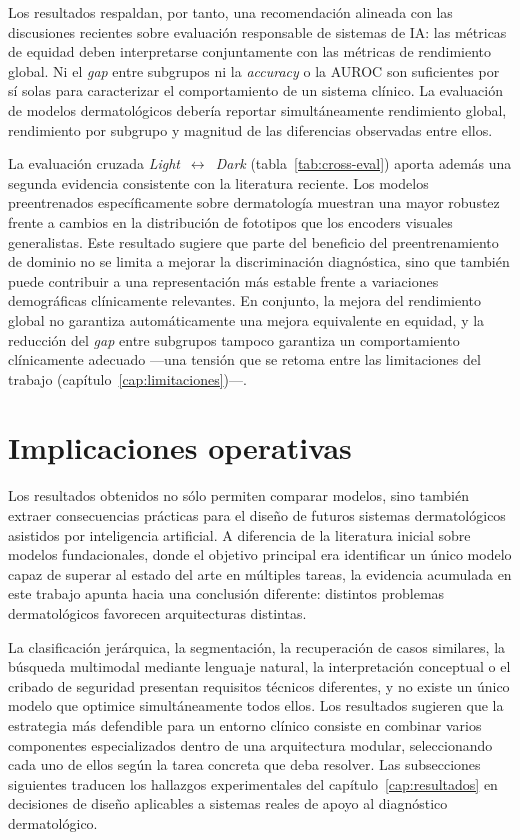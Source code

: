 Los resultados respaldan, por tanto, una recomendación alineada con las
discusiones recientes sobre evaluación responsable de sistemas de IA:
las métricas de equidad deben interpretarse conjuntamente con las
métricas de rendimiento global. Ni el \emph{gap} entre subgrupos ni la
\emph{accuracy} o la AUROC son suficientes por sí solas para caracterizar
el comportamiento de un sistema clínico. La evaluación de modelos
dermatológicos debería reportar simultáneamente rendimiento global,
rendimiento por subgrupo y magnitud de las diferencias observadas entre
ellos.

La evaluación cruzada \emph{Light}~$\leftrightarrow$~\emph{Dark}
(tabla~\ref{tab:cross-eval}) aporta además una segunda evidencia
consistente con la literatura reciente. Los modelos preentrenados
específicamente sobre dermatología muestran una mayor robustez frente a
cambios en la distribución de fototipos que los encoders visuales
generalistas. Este resultado sugiere que parte del beneficio del
preentrenamiento de dominio no se limita a mejorar la discriminación
diagnóstica, sino que también puede contribuir a una representación más
estable frente a variaciones demográficas clínicamente relevantes. En
conjunto, la mejora del rendimiento global no garantiza automáticamente
una mejora equivalente en equidad, y la reducción del \emph{gap} entre
subgrupos tampoco garantiza un comportamiento clínicamente adecuado
---una tensión que se retoma entre las limitaciones del trabajo
(capítulo~\ref{cap:limitaciones})---.

\section{Implicaciones operativas}
\label{sec:implicaciones}

Los resultados obtenidos no sólo permiten comparar modelos, sino también
extraer consecuencias prácticas para el diseño de futuros sistemas
dermatológicos asistidos por inteligencia artificial. A diferencia de la
literatura inicial sobre modelos fundacionales, donde el objetivo
principal era identificar un único modelo capaz de superar al estado del
arte en múltiples tareas, la evidencia acumulada en este trabajo apunta
hacia una conclusión diferente: distintos problemas dermatológicos
favorecen arquitecturas distintas.

La clasificación jerárquica, la segmentación, la recuperación de casos
similares, la búsqueda multimodal mediante lenguaje natural, la
interpretación conceptual o el cribado de seguridad presentan requisitos
técnicos diferentes, y no existe un único modelo que optimice
simultáneamente todos ellos. Los resultados sugieren que la estrategia
más defendible para un entorno clínico consiste en combinar varios
componentes especializados dentro de una arquitectura modular,
seleccionando cada uno de ellos según la tarea concreta que deba
resolver. Las subsecciones siguientes traducen los hallazgos
experimentales del capítulo~\ref{cap:resultados} en decisiones de diseño
aplicables a sistemas reales de apoyo al diagnóstico dermatológico.

